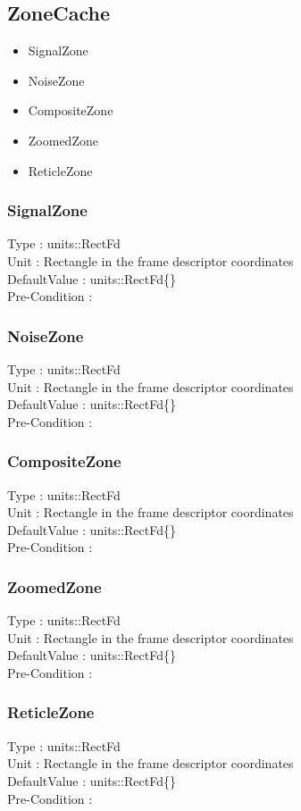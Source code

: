 
\subsection{ZoneCache}
\begin{itemize}
    \item SignalZone
    \item NoiseZone
    \item CompositeZone
    \item ZoomedZone
    \item ReticleZone
\end{itemize}

\subsubsection{SignalZone}
\noindent
Type : units::RectFd \\
Unit : Rectangle in the frame descriptor coordinates \\
DefaultValue : units::RectFd\{\} \\
Pre-Condition : \\

\subsubsection{NoiseZone}
\noindent
Type : units::RectFd \\
Unit : Rectangle in the frame descriptor coordinates \\
DefaultValue : units::RectFd\{\} \\
Pre-Condition : \\

\subsubsection{CompositeZone}
\noindent
Type : units::RectFd \\
Unit : Rectangle in the frame descriptor coordinates \\
DefaultValue : units::RectFd\{\} \\
Pre-Condition : \\

\subsubsection{ZoomedZone}
\noindent
Type : units::RectFd \\
Unit : Rectangle in the frame descriptor coordinates \\
DefaultValue : units::RectFd\{\} \\
Pre-Condition : \\

\subsubsection{ReticleZone}
\noindent
Type : units::RectFd \\
Unit : Rectangle in the frame descriptor coordinates \\
DefaultValue : units::RectFd\{\} \\
Pre-Condition : \\

